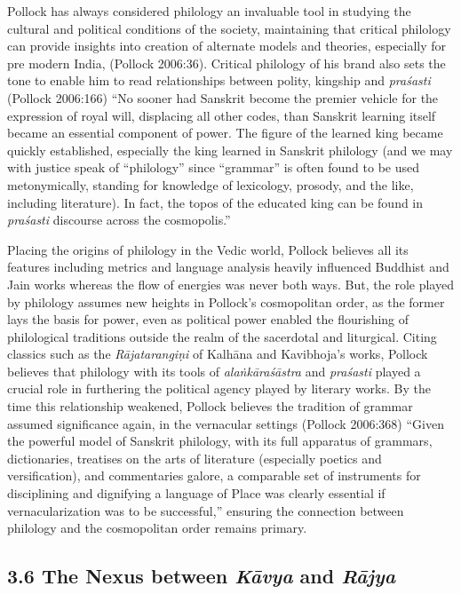 Pollock has always considered philology an invaluable tool in studying the cultural and political conditions of the society, maintaining that critical philology can provide insights into creation of alternate models and theories, especially for pre modern India, (Pollock 2006:36). Critical philology of his brand also sets the tone to enable him to read relationships between polity, kingship and \textit{praśasti} (Pollock 2006:166) “No sooner had Sanskrit become the premier vehicle for the expression of royal will, displacing all other codes, than Sanskrit learning itself became an essential component of power. The figure of the learned king became quickly established, especially the king learned in Sanskrit philology (and we may with justice speak of “philology” since “grammar” is often found to be used metonymically, standing for knowledge of lexicology, prosody, and the like, including literature). In fact, the topos of the educated king can be found in \textit{praśasti} discourse across the cosmopolis.”

Placing the origins of philology in the Vedic world, Pollock believes all its features including metrics and language analysis heavily influenced Buddhist and Jain works whereas the flow of energies was never both ways. But, the role played by philology assumes new heights in Pollock’s cosmopolitan order, as the former lays the basis for power, even as political power enabled the flourishing of philological traditions outside the realm of the sacerdotal and liturgical. Citing classics such as the \textit{Rājatarangiṇi} of Kalhāna and Kavibhoja’s works, Pollock believes that philology with its tools of \textit{alaṅkāraśāstra} and \textit{praśasti} played a crucial role in furthering the political agency played by literary works. By the time this relationship weakened, Pollock believes the tradition of grammar assumed significance again, in the vernacular settings (Pollock 2006:368) “Given the powerful model of Sanskrit philology, with its full apparatus of grammars, dictionaries, treatises on the arts of literature (especially poetics and versification), and commentaries galore, a comparable set of instruments for disciplining and dignifying a language of Place was clearly essential if vernacularization was to be successful,” ensuring the connection between philology and the cosmopolitan order remains primary.


\subsection*{3.6 The Nexus between \textit{Kāvya} and \textit{Rājya}}

